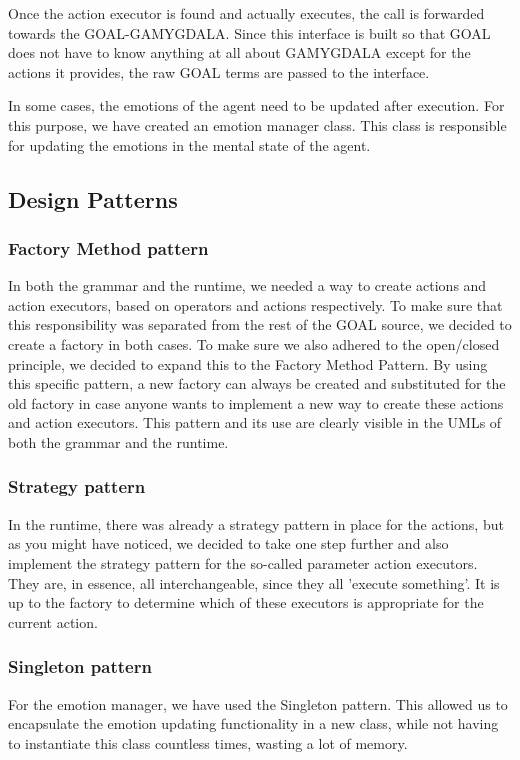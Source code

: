 Once the action executor is found and actually executes, the call is forwarded towards the GOAL-GAMYGDALA. Since this interface is built so that GOAL does not have to know anything at all about GAMYGDALA except for the actions it provides, the raw GOAL terms are passed to the interface.

In some cases, the emotions of the agent need to be updated after execution. For this purpose, we have created an emotion manager class. This class is responsible for updating the emotions in the mental state of the agent.

\subsection{Design Patterns}
\subsubsection{Factory Method pattern}
In both the grammar and the runtime, we needed a way to create actions and action executors, based on operators and actions respectively. To make sure that this responsibility was separated from the rest of the GOAL source, we decided to create a factory in both cases. To make sure we also adhered to the open/closed principle, we decided to expand this to the Factory Method Pattern. By using this specific pattern, a new factory can always be created and substituted for the old factory in case anyone wants to implement a new way to create these actions and action executors. This pattern and its use are clearly visible in the UMLs of both the grammar and the runtime.

\subsubsection{Strategy pattern}
In the runtime, there was already a strategy pattern in place for the actions, but as you might have noticed, we decided to take one step further and also implement the strategy pattern for the so-called parameter action executors. They are, in essence, all interchangeable, since they all 'execute something'. It is up to the factory to determine which of these executors is appropriate for the current action.

\subsubsection{Singleton pattern}
For the emotion manager, we have used the Singleton pattern. This allowed us to encapsulate the emotion updating functionality in a new class, while not having to instantiate this class countless times, wasting a lot of memory.

